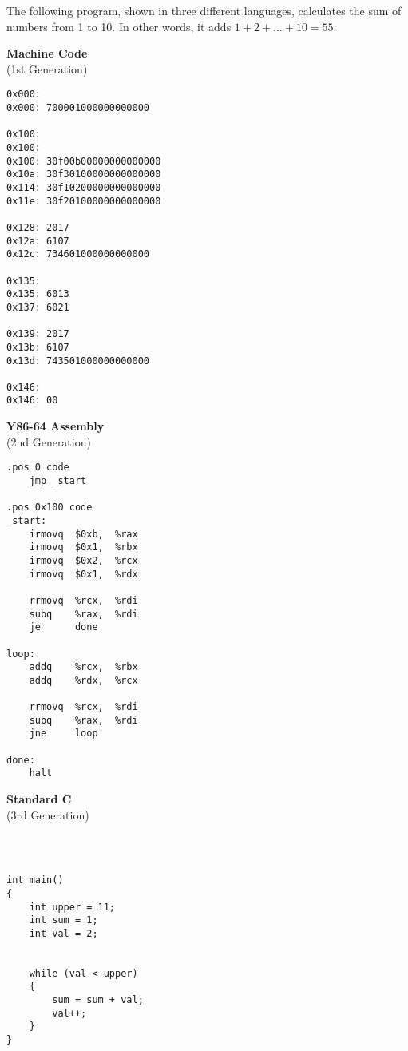 
The following program, shown in three different languages, calculates the sum of numbers from 1 to 10.
In other words, it adds $1 + 2 + \ldots + 10 = 55$.

\begin{center}
\begin{minipage}[t]{168pt}

\textbf{Machine Code} \\
(1st Generation)

\begin{verbatim}
0x000:
0x000: 700001000000000000

0x100:
0x100:
0x100: 30f00b00000000000000
0x10a: 30f30100000000000000
0x114: 30f10200000000000000
0x11e: 30f20100000000000000

0x128: 2017
0x12a: 6107
0x12c: 734601000000000000

0x135:
0x135: 6013
0x137: 6021

0x139: 2017
0x13b: 6107
0x13d: 743501000000000000

0x146:
0x146: 00
\end{verbatim}
\end{minipage}
\hfill\vline\hfill
\begin{minipage}[t]{144pt}

\textbf{Y86-64 Assembly} \\
(2nd Generation)

\begin{verbatim}
.pos 0 code
    jmp _start

.pos 0x100 code
_start:
    irmovq  $0xb,  %rax
    irmovq  $0x1,  %rbx
    irmovq  $0x2,  %rcx
    irmovq  $0x1,  %rdx

    rrmovq  %rcx,  %rdi
    subq    %rax,  %rdi
    je      done

loop:
    addq    %rcx,  %rbx
    addq    %rdx,  %rcx

    rrmovq  %rcx,  %rdi
    subq    %rax,  %rdi
    jne     loop

done:
    halt
\end{verbatim}
\end{minipage}
\hfill\vline\hfill
\begin{minipage}[t]{148pt}

\textbf{Standard C} \\
(3rd Generation)

\begin{verbatim}



int main()
{
    int upper = 11;
    int sum = 1;
    int val = 2;


    while (val < upper)
    {
        sum = sum + val;
        val++;
    }
}
\end{verbatim}
\end{minipage}
\end{center}


